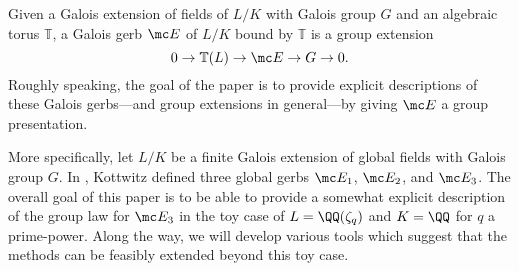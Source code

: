 
Given a Galois extension of fields of $L/K$ with Galois group $G$ and an algebraic torus $\mathbb T$, a Galois gerb $\mc E$ of $L/K$ bound by $\mathbb T$ is a group extension
\[0\to\mathbb T(L)\to\mc E\to G\to0.\]
Roughly speaking, the goal of the paper is to provide explicit descriptions of these Galois gerbs---and group extensions in general---by giving $\mc E$ a group presentation.

More specifically, let $L/K$ be a finite Galois extension of global fields with Galois group $G$. In \cite{kottwitz}, Kottwitz defined three global gerbs $\mc E_1$, $\mc E_2$, and $\mc E_3$. The overall goal of this paper is to be able to provide a somewhat explicit description of the group law for $\mc E_3$ in the toy case of $L=\QQ(\zeta_q)$ and $K=\QQ$ for $q$ a prime-power. Along the way, we will develop various tools which suggest that the methods can be feasibly extended beyond this toy case.

